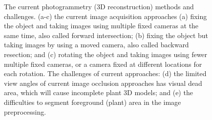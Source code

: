 \begin{figure}[htb]
  \begin{center}
  \end{center}
  \caption[Current photogrammetry (3D reconstruction) methods and challenges]{
    The current photogrammetry (3D reconstruction) methods and challenges. (a-c) the current image acquisition approaches (a) fixing the object and taking images using multiple fixed cameras at the same time, also called forward intersection; (b) fixing the object but taking images by using a moved camera, also called backward resection; and (c) rotating the object and taking images using fewer multiple fixed cameras, or a camera fixed at different locations for each rotation. The challenges of current approaches: (d) the limited view angles of current image occlusion approaches has visual dead area, which will cause incomplete plant 3D models; and (e) the difficulties to segment foreground (plant) area in the image preprocessing.
  }
  \label{fig:des1}
\end{figure}